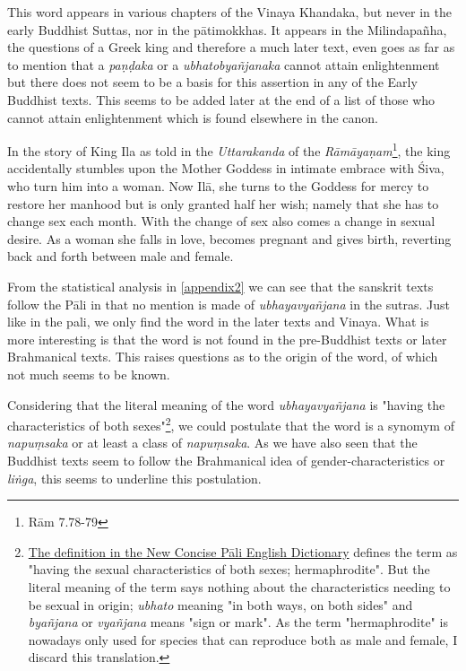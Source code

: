This word appears in various chapters of the Vinaya Khandaka, but never in the early Buddhist Suttas, nor in the pātimokkhas. It appears in the Milindapañha, the questions of a Greek king and therefore a much later text, even goes as far as to mention that a {\em paṇḍaka } or a {\em ubhatob­yañ­janaka } cannot attain enlightenment but there does not seem to be a basis for this assertion in any of the Early Buddhist texts. This seems to be added later at the end of a list of those who cannot attain enlightenment which is found elsewhere in the canon.


\cite{goldman} In the story of King Ila as told in the {\em Uttarakanda} of the {\em Rāmāyaṇam}\footnote{Rām 7.78-79}, the king accidentally stumbles upon the Mother Goddess in intimate embrace with Śiva, who turn him into a woman. Now Ilā, she turns to the Goddess for mercy to restore her manhood but is only granted half her wish; namely that she has to change sex each month. With the change of sex also comes a change in sexual desire. As a woman she falls in love, becomes pregnant and gives birth, reverting back and forth between male and female. 

From the statistical analysis in \ref{appendix2} we can see that the sanskrit texts follow the Pāli in that no mention is made of {\em ubhayavyañjana} in the sutras. Just like in the pali, we only find the word in the later texts and Vinaya. What is more interesting is that the word is not found in the pre-Buddhist texts or later Brahmanical texts. This raises questions as to the origin of the word, of which not much seems to be known.

Considering that the literal meaning of the word {\em ubhayavyañjana} is "having the characteristics of both sexes"\footnote{\href{https://suttacentral.net/define/ubhatovya%C3%B1janaka}{The definition in the New Concise Pāli English Dictionary} defines the term as "having the sexual characteristics of both sexes; hermaphrodite". But the literal meaning of the term says nothing about the characteristics needing to be sexual in origin; {\em ubhato} meaning "in both ways, on both sides" and {\em byañjana} or {\em vyañjana} means "sign or mark". As the term "hermaphrodite" is nowadays only used for species that can reproduce both as male and female, I discard this translation.}, we could postulate that the word is a synomym of {\em napuṃsaka} or at least a class of {\em napuṃsaka}. As we have also seen that the Buddhist texts seem to follow the Brahmanical idea of gender-characteristics or {\em liṅga}, this seems to underline this postulation.


